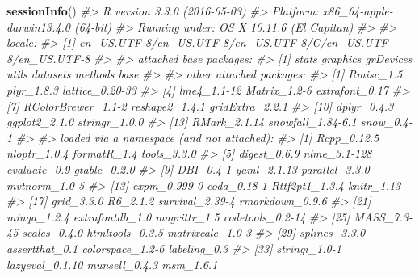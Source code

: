 \documentclass[]{article}
\newenvironment{Shaded}{\begin{snugshade}}{\end{snugshade}}
\newcommand{\KeywordTok}[1]{\textcolor[rgb]{0.13,0.29,0.53}{\textbf{{#1}}}}
\newcommand{\CommentTok}[1]{\textcolor[rgb]{0.56,0.35,0.01}{\textit{{#1}}}}
\newcommand{\NormalTok}[1]{{#1}}
\begin{document}
\begin{Shaded}
\begin{Highlighting}[]
\KeywordTok{sessionInfo}\NormalTok{()}
\CommentTok{#> R version 3.3.0 (2016-05-03)}
\CommentTok{#> Platform: x86_64-apple-darwin13.4.0 (64-bit)}
\CommentTok{#> Running under: OS X 10.11.6 (El Capitan)}
\CommentTok{#> }
\CommentTok{#> locale:}
\CommentTok{#> [1] en_US.UTF-8/en_US.UTF-8/en_US.UTF-8/C/en_US.UTF-8/en_US.UTF-8}
\CommentTok{#> }
\CommentTok{#> attached base packages:}
\CommentTok{#> [1] stats     graphics  grDevices utils     datasets  methods   base     }
\CommentTok{#> }
\CommentTok{#> other attached packages:}
\CommentTok{#>  [1] Rmisc_1.5          plyr_1.8.3         lattice_0.20-33   }
\CommentTok{#>  [4] lme4_1.1-12        Matrix_1.2-6       extrafont_0.17    }
\CommentTok{#>  [7] RColorBrewer_1.1-2 reshape2_1.4.1     gridExtra_2.2.1   }
\CommentTok{#> [10] dplyr_0.4.3        ggplot2_2.1.0      stringr_1.0.0     }
\CommentTok{#> [13] RMark_2.1.14       snowfall_1.84-6.1  snow_0.4-1        }
\CommentTok{#> }
\CommentTok{#> loaded via a namespace (and not attached):}
\CommentTok{#>  [1] Rcpp_0.12.5      nloptr_1.0.4     formatR_1.4      tools_3.3.0     }
\CommentTok{#>  [5] digest_0.6.9     nlme_3.1-128     evaluate_0.9     gtable_0.2.0    }
\CommentTok{#>  [9] DBI_0.4-1        yaml_2.1.13      parallel_3.3.0   mvtnorm_1.0-5   }
\CommentTok{#> [13] expm_0.999-0     coda_0.18-1      Rttf2pt1_1.3.4   knitr_1.13      }
\CommentTok{#> [17] grid_3.3.0       R6_2.1.2         survival_2.39-4  rmarkdown_0.9.6 }
\CommentTok{#> [21] minqa_1.2.4      extrafontdb_1.0  magrittr_1.5     codetools_0.2-14}
\CommentTok{#> [25] MASS_7.3-45      scales_0.4.0     htmltools_0.3.5  matrixcalc_1.0-3}
\CommentTok{#> [29] splines_3.3.0    assertthat_0.1   colorspace_1.2-6 labeling_0.3    }
\CommentTok{#> [33] stringi_1.0-1    lazyeval_0.1.10  munsell_0.4.3    msm_1.6.1}
\end{Highlighting}
\end{Shaded}
\end{document}
